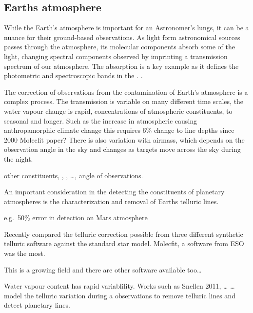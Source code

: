\subsection{Earths atmosphere}
While the Earth's atmosphere is important for an Astronomer's lungs, it can be a nuance for their ground-based observations. As light form astronomical sources passes through the atmosphere, its molecular components absorb some of the light, changing spectral components observed  by imprinting a transmission spectrum of our atmosphere. The  absorption is a key example as it defines the photometric and spectroscopic bands in the \nir{}. .

The correction of observations from the contamination of Earth's atmosphere is a complex process. The transmission is variable on many different time scales, the water vapour change is rapid, concentrations of atmospheric constituents, to seasonal and longer. Such as the increase in atmospheric  causing anthropamorphic climate change this requires 6\% change to  line depths since 2000 Molecfit paper? There is also variation with airmass, which depends on the observation angle in the sky and changes as targets move across the sky during the night.

other constituents, , ,  \ldots{}, angle of observations.

An important consideration in the detecting the constituents of planetary atmospheres is the characterization and removal of Earths telluric lines.

e.g.\ 50\% error in  detection on Mars atmosphere


Recently \citet{ulmer-moll_telluric_2018} compared the telluric correction possible from three different synthetic telluric software against the standard star model. Molecfit, a software from ESO was the most.

This is a growing field and there are other software available too\ldots{}


Water vapour content has rapid variablility. Works such as Snellen 2011, \ldots{} \ldots{}  model the telluric variation during a observations to remove telluric lines and detect planetary lines.




